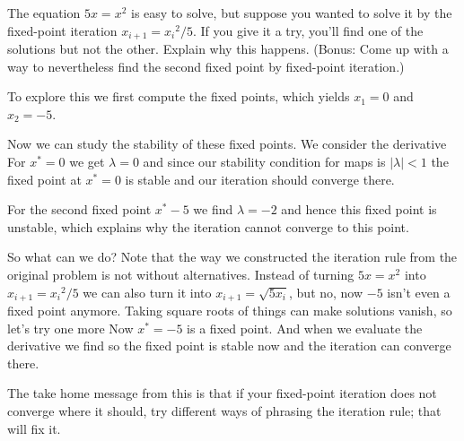 \subquestion 
The equation $5x=x^2$ is easy to solve, but suppose you wanted to solve it by the fixed-point iteration $x_{i+1}={x_i}^2/5$. If you give it a try, you'll find one of the solutions but not the other. Explain why this happens. (Bonus: Come up with a way to nevertheless find the second fixed point by fixed-point iteration.)

\solution 
To explore this we first compute the fixed points, which yields $x_1=0$ and $x_2=-5$.

Now we can study the stability of these fixed points. We consider the derivative
For $x^*=0$ we get $\lambda=0$ and since our stability condition for maps is $|\lambda|<1$ the fixed point at $x^*=0$ is stable and our iteration should converge there. 

For the second fixed point $x^*-5$ we find $\lambda=-2$ and hence this fixed point is unstable, which explains why the iteration cannot converge to this point. 

So what can we do? Note that the way we constructed the iteration rule from the original problem is not without alternatives. Instead of turning $5x=x^2$ into $x_{i+1}={x_i}^2/5$ we can also turn it into 
$x_{i+1}=\sqrt{5x_i}$, but no, now $-5$ isn't even a fixed point anymore. Taking square roots of things can make solutions vanish, so let's try one more
Now $x^*=-5$ is a fixed point. And when we evaluate the derivative we find 
so the fixed point is stable now and the iteration can converge there. 

The take home message from this is that if your fixed-point iteration does not converge where it should, try different ways of phrasing the iteration rule; that will fix it. 
